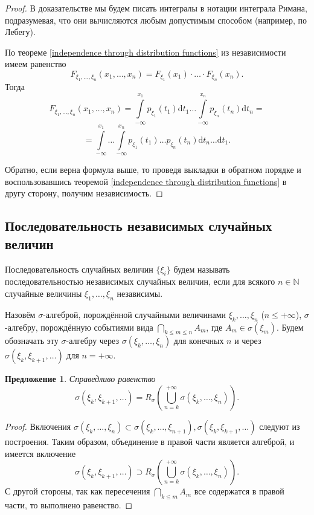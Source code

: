 \documentclass[12pt]{article}
\newtheorem{proposition}[theorem]{Предложение}
\numberwithin{theorem}{section}
\theoremstyle{definition}
\newcommand{\defin}[2]{\hypertarget{#2}{{\color{red} #1}}}
\newcommand{\diff}{\mathrm{d}}
\begin{document}
	\begin{proof}
		В доказательстве мы будем писать интегралы в нотации интеграла Римана, 
		подразумевая, что они вычисляются любым допустимым способом (например, по Лебегу).
		
		По теореме \ref{independence through distribution functions} из независимости
		имеем равенство
		$$ F_{\xi_1, \ldots, \xi_n}(x_1, \ldots, x_n) = F_{\xi_1}(x_1) \cdot \ldots \cdot F_{\xi_n}(x_n). $$
		Тогда
		$$ F_{\xi_1, \ldots, \xi_n}(x_1, \ldots, x_n) 
		= \int\limits_{-\infty}^{x_1} p_{\xi_1}(t_1)\diff t_1 \ldots \int\limits_{-\infty}^{x_n} p_{\xi_n}(t_n)\diff t_n = $$
		$$ = \int\limits_{-\infty}^{x_1} \ldots \int\limits_{-\infty}^{x_n} 
		p_{\xi_1}(t_1)\ldots p_{\xi_n}(t_n) \diff t_n\ldots \diff t_1. $$
		
		Обратно, если верна формула выше,
		то проведя выкладки в обратном порядке и воспользовавшись теоремой \ref{independence through distribution functions}
		в другу сторону, получим независимость.
	\end{proof}
	
	\subsection{Последовательность независимых случайных величин}
	
	Последовательность случайных величин $ \{\xi_i\} $ будем называть 
	\defin{последовательностью независимых случайных величин}{independent-sequence},
	если для всякого $ n \in \mathbb{N} $ случайные величины $ \xi_1, \ldots, \xi_n $
	независимы.
	
	Назовём \defin{$ \sigma $-алгеброй, порождённой случайными величинами $ \xi_k, \ldots, \xi_n $ ($ n \leqslant +\infty $)}
	{generated-by-random-variables}, 
	$ \sigma $-алгебру, порождённую событиями вида $ \bigcap\limits_{k \leqslant m \leqslant n} A_m $,
	где $ A_m \in \sigma(\xi_m) $. Будем обозначать эту $ \sigma $-алгебру через $ \sigma(\xi_k, \ldots, \xi_n) $
	для конечных $ n $ и через $ \sigma(\xi_k, \xi_{k + 1}, \ldots) $ для $ n = +\infty $.
	
	\begin{proposition} \label{generation as limit}
		Справедливо равенство
		$$ \sigma(\xi_k, \xi_{k + 1}, \ldots) = R_{\sigma}(\bigcup\limits_{n = k}^{+\infty} \sigma(\xi_k, \ldots, \xi_n)). $$
	\end{proposition}
	
	\begin{proof}
		Включения $ \sigma(\xi_k, \ldots, \xi_n) \subset \sigma(\xi_k, \ldots, \xi_{n + 1}), 
		\sigma(\xi_k, \xi_{k + 1}, \ldots) $
		следуют из построения.
		Таким образом, объединение в правой части является алгеброй,
		и имеется включение 
		$$ \sigma(\xi_k, \xi_{k + 1}, \ldots) \supset R_{\sigma}(\bigcup\limits_{n = k}^{+\infty} \sigma(\xi_k, \ldots, \xi_n)). $$
		С другой стороны, так как пересечения $ \bigcap\limits_{k \leqslant m} A_m $
		все содержатся в правой части,
		то выполнено равенство.
	\end{proof}
	
\end{document}
